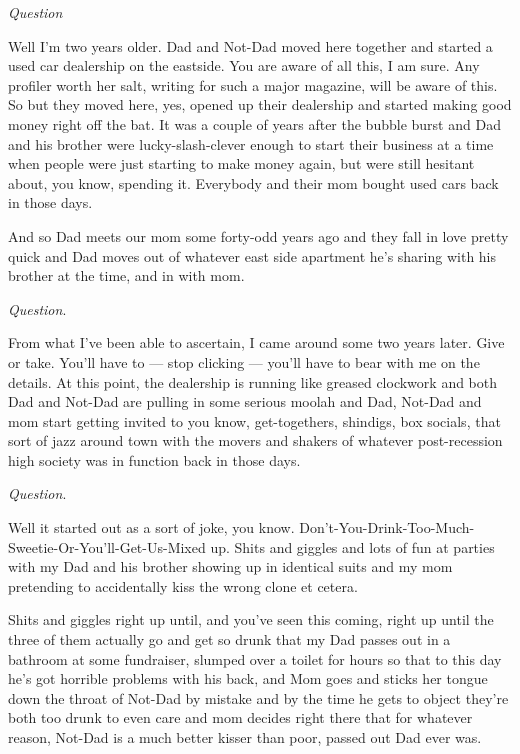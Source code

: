 {\em Question}



Well I'm two years older. Dad and Not-Dad moved here together
and started a used car dealership on the eastside. You are aware of
all this, I am sure. Any profiler worth her salt, writing for such
a major magazine, will be aware of this. So but they moved here,
yes, opened up their dealership and started making good money right
off the bat. It was a couple of years after the bubble burst and
Dad and his brother were lucky-slash-clever enough to start their
business at a time when people were just starting to make money
again, but were still hesitant about, you know, spending it.
Everybody and their mom bought used cars back in those days.

And so Dad meets our mom some forty-odd years ago and they fall in
love pretty quick and Dad moves out of whatever east side apartment
he's sharing with his brother at the time, and in with
mom.



{\em Question}.



From what I've been able to ascertain, I came around some two
years later. Give or take. You'll have to --- stop
clicking --- you'll have to bear with me on the details.
At this point, the dealership is running like greased clockwork and
both Dad and Not-Dad are pulling in some serious moolah and Dad,
Not-Dad and mom start getting invited to you know, get-togethers,
shindigs, box socials, that sort of jazz around town with the
movers and shakers of whatever post-recession high society was in
function back in those days.



{\em Question}.



Well it started out as a sort of joke, you know.
Don't-You-Drink-Too-Much-Sweetie-Or-You'll-Get-Us-Mixed
up. Shits and giggles and lots of fun at parties with my Dad and
his brother showing up in identical suits and my mom pretending to
accidentally kiss the wrong clone et cetera.

Shits and giggles right up until, and you've seen this
coming, right up until the three of them actually go and get so
drunk that my Dad passes out in a bathroom at some fundraiser,
slumped over a toilet for hours so that to this day he's got
horrible problems with his back, and Mom goes and sticks her tongue
down the throat of Not-Dad by mistake and by the time he gets to
object they're both too drunk to even care and mom decides
right there that for whatever reason, Not-Dad is a much better
kisser than poor, passed out Dad ever was.



